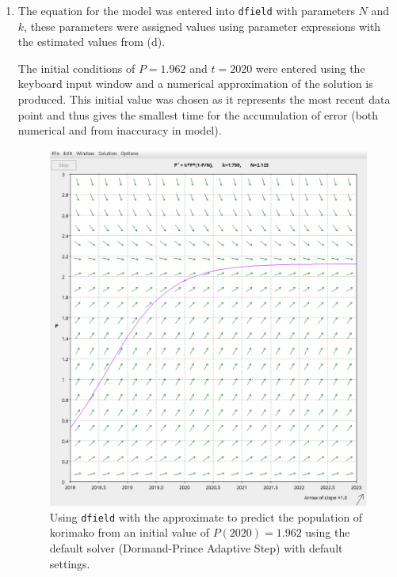 \documentclass[a4paper, 11pt]{article}
\begin{document}
\begin{enumerate}[label=(\alph*)]
  \item The equation for the model was entered into \texttt{dfield} with parameters $N$ and $k$, these parameters were assigned values using parameter expressions with the estimated values from (d). 
  
  The initial conditions of $P=1.962$ and $t=2020$ were entered using the keyboard input window and a numerical approximation of the solution is produced. This initial value was chosen as it represents the most recent data point and thus gives the smallest time for the accumulation of error (both numerical and from inaccuracy in model). 

  \begin{figure}[H]
    \centering
    \begin{minipage}{0.5\textwidth}
      \includegraphics*[width=\textwidth]{images/dfield.png}
      \caption{Using \texttt{dfield} with the approximate to predict the population of korimako from an initial value of $P(2020)= 1.962$ using the default solver (Dormand-Prince Adaptive Step) with default settings.}
      \label{fig:dfield}
    \end{minipage}
  \end{figure}


\end{enumerate}
\end{document}
